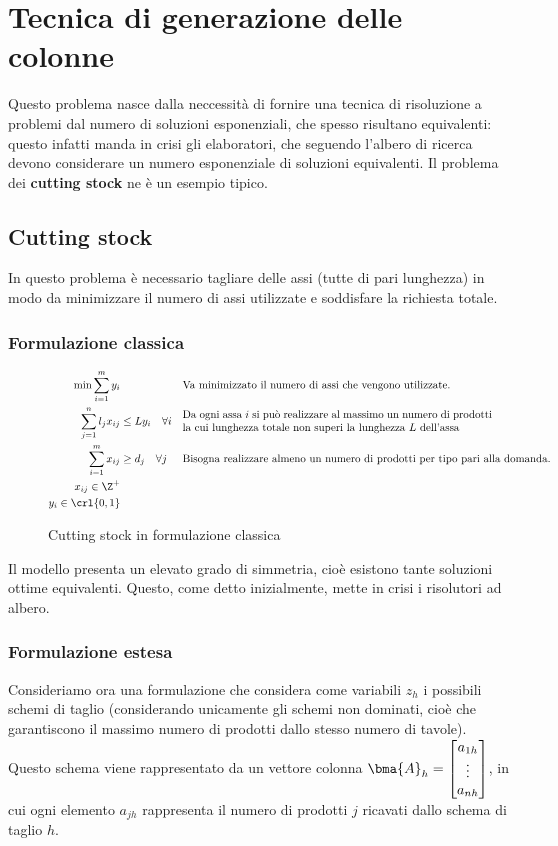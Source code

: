 \documentclass[\main/main.tex]{subfiles}
\begin{document}
\chapter{Tecnica di generazione delle colonne}
Questo problema nasce dalla neccessità di fornire una tecnica di risoluzione a problemi dal numero di soluzioni esponenziali, che spesso risultano equivalenti: questo infatti manda in crisi gli elaboratori, che seguendo l'albero di ricerca devono considerare un numero esponenziale di soluzioni equivalenti. Il problema dei \textbf{cutting stock} ne è un esempio tipico.

\section{Cutting stock}
In questo problema è necessario tagliare delle assi (tutte di pari lunghezza) in modo da minimizzare il numero di assi utilizzate e soddisfare la richiesta totale.

\subsection{Formulazione classica}

\begin{figure}
\begin{align*}
    \min \sum_{i=1}^m y_i & && \text{Va minimizzato il numero di assi che vengono utilizzate.}\\
    \sum_{j=1}^n l_j x_{ij} &\leq L y_i \quad \forall i &&\parbox{10cm}{Da ogni assa \(i\) si può realizzare al massimo un numero di prodotti la cui lunghezza totale non superi la lunghezza \(L\) dell'assa}\\
    \sum_{i=1}^m x_{ij} &\geq d_j \quad \forall j &&\text{Bisogna realizzare almeno un numero di prodotti per tipo pari alla domanda.}\\
    x_{ij} \in \Z^+\\
    y_i \in \crl{0,1}\\
\end{align*}
\caption{Cutting stock in formulazione classica}
\end{figure}

Il modello presenta un elevato grado di simmetria, cioè esistono tante soluzioni ottime equivalenti. Questo, come detto inizialmente, mette in crisi i risolutori ad albero.

\subsection{Formulazione estesa}
Consideriamo ora una formulazione che considera come variabili \(z_h\) i possibili schemi di taglio (considerando unicamente gli schemi non dominati, cioè che garantiscono il massimo numero di prodotti dallo stesso numero di tavole). Questo schema viene rappresentato da un vettore colonna \(\bma{A}_h = \begin{bmatrix}
    a_{1h}\\
    \vdots \\
    a_{nh}
\end{bmatrix}\), in cui ogni elemento \(a_{jh}\) rappresenta il numero di prodotti \(j\) ricavati dallo schema di taglio \(h\).
\end{document}
